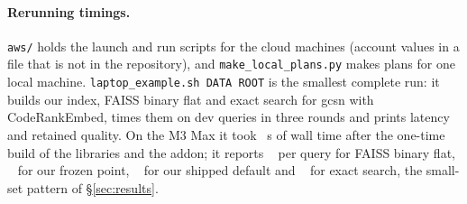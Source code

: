 \paragraph{Rerunning timings.} \texttt{aws/} holds the launch and run scripts for the cloud machines (account values in
a file that is not in the repository), and \texttt{make\_local\_plans.py} makes plans for one local machine.
\texttt{laptop\_example.sh DATA ROOT} is the smallest complete run: it builds our index, FAISS binary flat and exact
search for gcsn with CodeRankEmbed, times them on dev queries in three rounds and prints latency and retained quality. On
the M3 Max it took ~s of wall time after the one-time build of the libraries and the addon; it reports
~\us{} per query for FAISS binary flat, ~\us{} for our frozen point, ~\us{}
for our shipped default and ~\us{} for exact search, the small-set pattern of \S\ref{sec:results}.
\fussy
